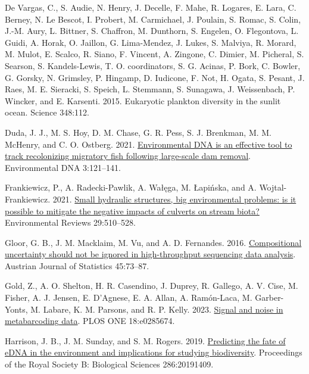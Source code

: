 \documentclass[
]{article}
\newlength{\cslhangindent}
\newlength{\cslentryspacingunit} %
\newenvironment{CSLReferences}[2] %
 {%
  \setlength{\parindent}{0pt}
  \ifodd #1
  \let\oldpar\par
  \def\par{\hangindent=\cslhangindent\oldpar}
  \fi
  \setlength{\parskip}{#2\cslentryspacingunit}
 }%
 {}
\begin{document}
\begin{CSLReferences}{1}{0}
\leavevmode{}%
De Vargas, C., S. Audie, N. Henry, J. Decelle, F. Mahe, R. Logares, E.
Lara, C. Berney, N. Le Bescot, I. Probert, M. Carmichael, J. Poulain, S.
Romac, S. Colin, J.-M. Aury, L. Bittner, S. Chaffron, M. Dunthorn, S.
Engelen, O. Flegontova, L. Guidi, A. Horak, O. Jaillon, G. Lima-Mendez,
J. Lukes, S. Malviya, R. Morard, M. Mulot, E. Scalco, R. Siano, F.
Vincent, A. Zingone, C. Dimier, M. Picheral, S. Searson, S.
Kandels-Lewis, T. O. coordinators, S. G. Acinas, P. Bork, C. Bowler, G.
Gorsky, N. Grimsley, P. Hingamp, D. Iudicone, F. Not, H. Ogata, S.
Pesant, J. Raes, M. E. Sieracki, S. Speich, L. Stemmann, S. Sunagawa, J.
Weissenbach, P. Wincker, and E. Karsenti. 2015. Eukaryotic plankton
diversity in the sunlit ocean. Science 348:112.

\leavevmode{}%
Duda, J. J., M. S. Hoy, D. M. Chase, G. R. Pess, S. J. Brenkman, M. M.
McHenry, and C. O. Ostberg. 2021.
\href{https://doi.org/10.1002/edn3.134}{Environmental DNA is an
effective tool to track recolonizing migratory fish following
large-scale dam removal}. Environmental DNA 3:121--141.

\leavevmode{}%
Frankiewicz, P., A. Radecki-Pawlik, A. Wałęga, M. Łapińska, and A.
Wojtal-Frankiewicz. 2021.
\href{https://doi.org/10.1139/er-2020-0126}{Small hydraulic structures,
big environmental problems: is it possible to mitigate the negative
impacts of culverts on stream biota?} Environmental Reviews 29:510--528.

\leavevmode{}%
Gloor, G. B., J. M. Macklaim, M. Vu, and A. D. Fernandes. 2016.
\href{https://doi.org/10.17713/ajs.v45i4.122}{Compositional uncertainty
should not be ignored in high-throughput sequencing data analysis}.
Austrian Journal of Statistics 45:73--87.

\leavevmode{}%
Gold, Z., A. O. Shelton, H. R. Casendino, J. Duprey, R. Gallego, A. V.
Cise, M. Fisher, A. J. Jensen, E. D'Agnese, E. A. Allan, A. Ramón-Laca,
M. Garber-Yonts, M. Labare, K. M. Parsons, and R. P. Kelly. 2023.
\href{https://doi.org/10.1371/journal.pone.0285674}{Signal and noise in
metabarcoding data}. PLOS ONE 18:e0285674.

\leavevmode{}%
Harrison, J. B., J. M. Sunday, and S. M. Rogers. 2019.
\href{https://doi.org/10.1098/rspb.2019.1409}{Predicting the fate of
eDNA in the environment and implications for studying biodiversity}.
Proceedings of the Royal Society B: Biological Sciences 286:20191409.


\end{CSLReferences}
\end{document}
